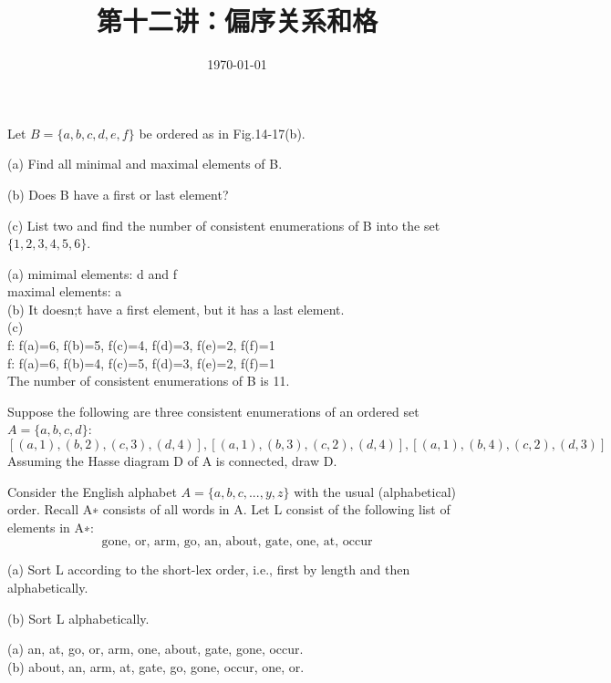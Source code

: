 \documentclass[11pt, a4paper, UTF8]{ctexart}
\title{第十二讲：偏序关系和格}
\date{\today}     %
\begin{document}
\maketitle
\noplagiarism	%
\beginthishw	%

\begin{problem}[SM: 14.32]
Let \(B = \{a, b, c, d, e, f \}\) be ordered as in Fig.14-17(b).

(a) Find all minimal and maximal elements of B.

(b) Does B have a first or last element?

(c) List two and find the number of consistent enumerations of B into the set \(\{1, 2, 3, 4, 5, 6\}\).
\end{problem}
\begin{solution}
(a) mimimal elements: d and f\\
maximal elements: a\\
(b) It doesn;t have a first element, but it has a last element.\\
(c) \\
f: f(a)=6, f(b)=5, f(c)=4, f(d)=3, f(e)=2, f(f)=1\\
f: f(a)=6, f(b)=4, f(c)=5, f(d)=3, f(e)=2, f(f)=1\\
The number of consistent enumerations of B is 11.
\end{solution}


\begin{problem}[SM: 14.44]
Suppose the following are three consistent enumerations of an ordered set \(A = \{a, b, c, d\}\):
\[[(a, 1), (b, 2), (c, 3), (d, 4)], [(a, 1), (b, 3), (c, 2), (d, 4)], [(a, 1), (b, 4), (c, 2), (d, 3)]\]
Assuming the Hasse diagram D of A is connected, draw D.
\end{problem}
\begin{solution}
\end{solution}



\begin{problem}[SM: 14.46]
Consider the English alphabet \(A = \{a, b, c, . . . , y, z\}\) with the usual (alphabetical) order. Recall A∗ consists of all words in A. Let L consist of the following list of elements in A∗:
\[\mbox{gone, or, arm, go, an, about, gate, one, at, occur}\]

(a) Sort L according to the short-lex order, i.e., first by length and then alphabetically.

(b) Sort L alphabetically.
\end{problem}
\begin{solution}
(a) an, at, go, or, arm, one, about, gate, gone, occur.\\
(b) about, an, arm, at, gate, go, gone, occur, one, or.\\
\end{solution}
\end{document}
